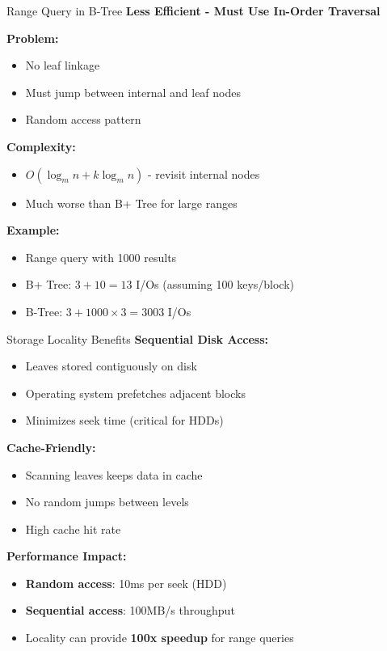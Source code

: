 \documentclass[aspectratio=169]{beamer}
\begin{document}
\begin{frame}{Range Query in B-Tree}
  \textbf{Less Efficient - Must Use In-Order Traversal}

  \vspace{0.3cm}
  \textbf{Problem:}
  \begin{itemize}
    \item No leaf linkage
    \item Must jump between internal and leaf nodes
    \item Random access pattern
  \end{itemize}

  \vspace{0.3cm}
  \textbf{Complexity:}
  \begin{itemize}
    \item $O(\log_m n + k \log_m n)$ - revisit internal nodes
    \item Much worse than B+ Tree for large ranges
  \end{itemize}

  \vspace{0.3cm}
  \textbf{Example:}
  \begin{itemize}
    \item Range query with 1000 results
    \item B+ Tree: $3 + 10 = 13$ I/Os (assuming 100 keys/block)
    \item B-Tree: $3 + 1000 \times 3 = 3003$ I/Os
  \end{itemize}
\end{frame}

\begin{frame}{Storage Locality Benefits}
  \textbf{Sequential Disk Access:}
  \begin{itemize}
    \item Leaves stored contiguously on disk
    \item Operating system prefetches adjacent blocks
    \item Minimizes seek time (critical for HDDs)
  \end{itemize}

  \vspace{0.3cm}
  \textbf{Cache-Friendly:}
  \begin{itemize}
    \item Scanning leaves keeps data in cache
    \item No random jumps between levels
    \item High cache hit rate
  \end{itemize}

  \vspace{0.3cm}
  \textbf{Performance Impact:}
  \begin{itemize}
    \item \textbf{Random access}: 10ms per seek (HDD)
    \item \textbf{Sequential access}: 100MB/s throughput
    \item Locality can provide \textbf{100x speedup} for range queries
  \end{itemize}
\end{frame}
\end{document}
